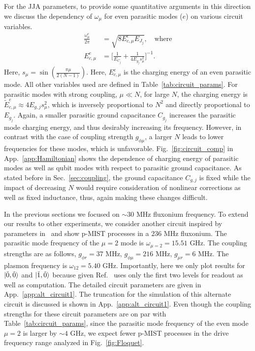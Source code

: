 \documentclass[%
reprint,
superscriptaddress,
 amsmath,amssymb,
 aps,
 prx,
longbibliography,
floatfix,
]{revtex4-2}
\begin{document}
For the JJA parameters, to provide some quantitative arguments in this direction we discuss the dependency of $\omega_\mu$ for even parasitic modes ($e$) on various circuit variables. 
\begin{align}
    \frac{\omega_\mu^e}{2\pi}&=\sqrt{8E_{c,\mu}^e E_{J_j}},\quad\text{where}\\
    E_{c,\mu}^e&=\Big[\frac{1}{E_{C_j}}+\frac{1}{4E_{g_j}s_\mu^2}\Big]^{-1}.\label{eq:parasitic}
\end{align}
Here, $s_\mu = \sin (\frac{\pi \mu}{2(N-1)})$. Here, $E_{c,\mu}^e$ is the charging energy of an even parasitic mode. All other variables used are defined in Table~\ref{tab:circuit_params}. For parasitic modes with strong coupling, $\mu\ll N$, for large $N$, the charging energy is $\tilde{E}^e_{c,\mu} \approx 4E_{g,j} s_\mu^2$, which is inversely proportional to $N^2$ and directly proportional to $E_{g_j}$. Again, a smaller parasitic ground capacitance $C_{g_j}$ increases the parasitic mode charging energy, and thus desirably increasing its frequency. However, in contrast with the case of coupling strength $g_{\phi\mu}$, a larger $N$ leads to lower frequencies for these modes, which is unfavorable. Fig.~\ref{fig:circuit_comp} in App.~\ref{app:Hamiltonian} shows the dependence of charging energy of parasitic modes as well as qubit modes with respect to parasitic ground capacitance. 
As stated before in Sec.~\ref{sec:coupling}, the ground capacitance $C_{g,j}$ is fixed while the impact of decreasing $N$ would require consideration of nonlinear corrections as well as fixed inductance, thus, again making these changes difficult. 


In the previous sections we focused on $\sim 30$ MHz fluxonium frequency. To extend our results to other experiments, we consider another circuit inspired by parameters in~\cite{ding_high-fidelity_2023} and show p-MIST processes in a $236$ MHz fluxonium. The parasitic mode frequency of the $\mu=2$ mode is $\omega_{\mu=2}=15.51$ GHz. The coupling strengths are as follows, $g_{\phi r}=37$ MHz, $g_{\phi\mu}=216$ MHz, $g_{\mu r}=6$ MHz. The plasmon frequency is $\omega_{12}=5.40$ GHz. Importantly, here we only plot results for $\ket{\tilde{0},\tilde{0}}$ and $\ket{\tilde{1},\tilde{0}}$ because given Ref.~\cite{ding_high-fidelity_2023} uses only the first two levels for readout as well as computation. The detailed circuit parameters are given in App.~\ref{app:alt_circuit1}. The truncation for the simulation of this alternate circuit is discussed is shown in App.~\ref{app:alt_circuit1}. Even though the coupling strengths for these circuit parameters are on par with Table~\ref{tab:circuit_params}, since the parasitic mode frequency of the even mode $\mu=2$ is larger by $\sim 4$ GHz, we expect fewer p-MIST processes in the drive frequency range analyzed in Fig.~\ref{fig:Floquet}. 
\end{document}

